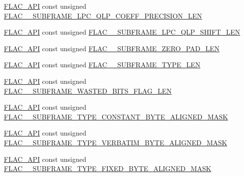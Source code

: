 \begin{DoxyCompactItemize}
\item 
\mbox{\hyperlink{group__flac__export_ga56ca07df8a23310707732b1c0007d6f5}{F\+L\+A\+C\+\_\+\+A\+PI}} const unsigned \mbox{\hyperlink{group__flac__format_ga1d983d775b492e968719457694737116}{F\+L\+A\+C\+\_\+\+\_\+\+S\+U\+B\+F\+R\+A\+M\+E\+\_\+\+L\+P\+C\+\_\+\+Q\+L\+P\+\_\+\+C\+O\+E\+F\+F\+\_\+\+P\+R\+E\+C\+I\+S\+I\+O\+N\+\_\+\+L\+EN}}
\item 
\mbox{\hyperlink{group__flac__export_ga56ca07df8a23310707732b1c0007d6f5}{F\+L\+A\+C\+\_\+\+A\+PI}} const unsigned \mbox{\hyperlink{group__flac__format_ga07ee16744f0933eaa665cec8f2ec5631}{F\+L\+A\+C\+\_\+\+\_\+\+S\+U\+B\+F\+R\+A\+M\+E\+\_\+\+L\+P\+C\+\_\+\+Q\+L\+P\+\_\+\+S\+H\+I\+F\+T\+\_\+\+L\+EN}}
\item 
\mbox{\hyperlink{group__flac__export_ga56ca07df8a23310707732b1c0007d6f5}{F\+L\+A\+C\+\_\+\+A\+PI}} const unsigned \mbox{\hyperlink{group__flac__format_ga11cc163e6aea53e590708bba61a01162}{F\+L\+A\+C\+\_\+\+\_\+\+S\+U\+B\+F\+R\+A\+M\+E\+\_\+\+Z\+E\+R\+O\+\_\+\+P\+A\+D\+\_\+\+L\+EN}}
\item 
\mbox{\hyperlink{group__flac__export_ga56ca07df8a23310707732b1c0007d6f5}{F\+L\+A\+C\+\_\+\+A\+PI}} const unsigned \mbox{\hyperlink{group__flac__format_ga1b8b7ac39c55c0fc7973821cd4297104}{F\+L\+A\+C\+\_\+\+\_\+\+S\+U\+B\+F\+R\+A\+M\+E\+\_\+\+T\+Y\+P\+E\+\_\+\+L\+EN}}
\item 
\mbox{\hyperlink{group__flac__export_ga56ca07df8a23310707732b1c0007d6f5}{F\+L\+A\+C\+\_\+\+A\+PI}} const unsigned \mbox{\hyperlink{group__flac__format_ga86d93adcc6b7f67eaecd19e5c3fbdfcf}{F\+L\+A\+C\+\_\+\+\_\+\+S\+U\+B\+F\+R\+A\+M\+E\+\_\+\+W\+A\+S\+T\+E\+D\+\_\+\+B\+I\+T\+S\+\_\+\+F\+L\+A\+G\+\_\+\+L\+EN}}
\item 
\mbox{\hyperlink{group__flac__export_ga56ca07df8a23310707732b1c0007d6f5}{F\+L\+A\+C\+\_\+\+A\+PI}} const unsigned \mbox{\hyperlink{group__flac__format_gadbf7a91c50f42a246aa1db9bd61bac16}{F\+L\+A\+C\+\_\+\+\_\+\+S\+U\+B\+F\+R\+A\+M\+E\+\_\+\+T\+Y\+P\+E\+\_\+\+C\+O\+N\+S\+T\+A\+N\+T\+\_\+\+B\+Y\+T\+E\+\_\+\+A\+L\+I\+G\+N\+E\+D\+\_\+\+M\+A\+SK}}
\item 
\mbox{\hyperlink{group__flac__export_ga56ca07df8a23310707732b1c0007d6f5}{F\+L\+A\+C\+\_\+\+A\+PI}} const unsigned \mbox{\hyperlink{group__flac__format_ga5855173f9bc3584b545b04cf6ba8f8f8}{F\+L\+A\+C\+\_\+\+\_\+\+S\+U\+B\+F\+R\+A\+M\+E\+\_\+\+T\+Y\+P\+E\+\_\+\+V\+E\+R\+B\+A\+T\+I\+M\+\_\+\+B\+Y\+T\+E\+\_\+\+A\+L\+I\+G\+N\+E\+D\+\_\+\+M\+A\+SK}}
\item 
\mbox{\hyperlink{group__flac__export_ga56ca07df8a23310707732b1c0007d6f5}{F\+L\+A\+C\+\_\+\+A\+PI}} const unsigned \mbox{\hyperlink{group__flac__format_gaf4ae885d07037bbcb46fb199f5f4d3a9}{F\+L\+A\+C\+\_\+\+\_\+\+S\+U\+B\+F\+R\+A\+M\+E\+\_\+\+T\+Y\+P\+E\+\_\+\+F\+I\+X\+E\+D\+\_\+\+B\+Y\+T\+E\+\_\+\+A\+L\+I\+G\+N\+E\+D\+\_\+\+M\+A\+SK}}

\end{DoxyCompactItemize}

